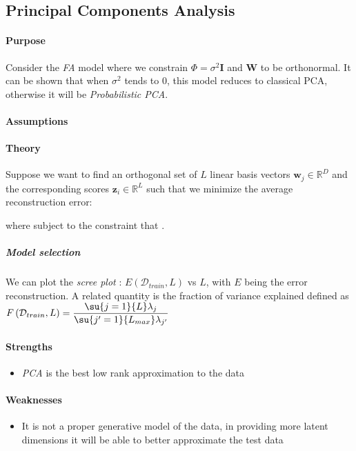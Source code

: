 \subsection{Principal Components Analysis}
\paragraph{Purpose}
Consider the \emph{FA} model where we constrain $\Phi = \sigma^{2}\bm{I}$ and $\bm{W}$
to be orthonormal. It can be shown that when $\sigma^{2}$ tends to 0, this model 
reduces to classical PCA, otherwise it will be \emph{Probabilistic PCA}.
\paragraph{Assumptions}
\paragraph{Theory}
Suppose we want to find an orthogonal set of $L$ linear basis vectors $\bm{w}_{j}\in
\mathbb{R}^{D}$ and the corresponding scores $\bm{z}_{i}\in\mathbb{R}^{L}$ such that we
minimize the average reconstruction error:
\begin{center}
\end{center}
where  subject to the constraint that . 
\subparagraph{Model selection}
We can plot the \emph{scree plot} : $E(\mathcal{D}_{train}, L)$ vs $L$, with $E$ being
the error reconstruction. 
A related quantity is the fraction of variance explained defined as $F\left(
\mathcal{D}_{train}, L\right) = \dfrac{\su{j=1}{L}\lambda_{j}}{\su{j'=1}{L_{max}}
\lambda_{j'}}$

\paragraph{Strengths}
\begin{itemize}
    \item \emph{PCA} is the best low rank approximation to the data
\end{itemize}

\paragraph{Weaknesses}
\begin{itemize}
    \item It is not a proper generative model of the data, in providing more latent 
        dimensions it will be able to better approximate the test data
\end{itemize}
